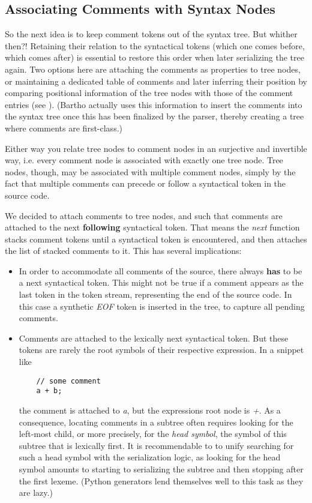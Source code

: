 \documentclass[11pt,a4paper]{article}
\begin{document}
\subsection{Associating Comments with Syntax Nodes}

So the next idea is to keep comment tokens out of the syntax tree. But whither
then?! Retaining their relation to the syntactical tokens (which one comes before,
which comes after) is essential to restore this order when later serializing the
tree again. Two options here are attaching the comments as properties to tree
nodes, or maintaining a dedicated table of comments and later inferring their
position by comparing positional information of the tree nodes with those of the
comment entries (see \cite{bartho-2009}). (Bartho actually uses this information
to insert the comments into the syntax tree once this has been finalized by the
parser, thereby creating a tree where comments are first-class.)

Either way you relate tree nodes to comment nodes in an surjective and
invertible way, i.e. every comment node is associated with exactly one tree
node. Tree nodes, though, may be associated with multiple comment nodes, simply
by the fact that multiple comments can precede or follow a syntactical token in
the source code.

We decided to attach comments to tree nodes, and such that comments are attached
to the next \textbf{following} syntactical token. That means the \textit{next}
function stacks comment tokens until a syntactical token is encountered,
and then attaches the list of stacked comments to it. This has several implications:

\begin{itemize}
\item In order to accommodate all comments of the source, there always
  \textbf{has} to be a next syntactical token. This might not be true if a
  comment appears as the last token in the token stream, representing the end of
  the source code. In this case a synthetic \textit{EOF} token is inserted in
  the tree, to capture all pending comments.
\item Comments are attached to the lexically next syntactical token. But these
  tokens are rarely the root symbols of their respective expression. In a
  snippet like \\
  \begin{verbatim}
    // some comment
    a + b;
  \end{verbatim}
  the comment is attached to \emph{a}, but the expressions root node is
  \emph{+}. As a consequence, locating comments in a subtree often requires
  looking for the left-most child, or more precisely, for the \emph{head
  symbol}, the symbol of this subtree that is lexically first. It is
  recommendable to to unify searching for such a head symbol with the
  serialization logic, as looking for the head symbol amounts to starting to
  serializing the subtree and then stopping after the first lexeme. (Python
  generators lend themselves well to this task as they are lazy.)
\end{itemize}
\end{document}
